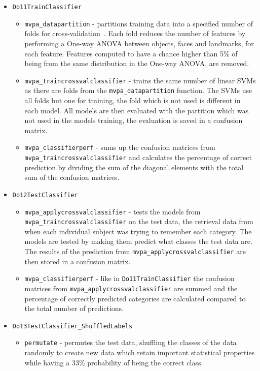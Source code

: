 \documentclass[12pt, a4paper]{article}
\begin{document}
\begin{itemize}
    \item \texttt{Do11TrainClassifier}
    \begin{itemize}
        \item \texttt{mvpa\_datapartition} - partitions training data into a specified number of folds for cross-validation~\cite{enwiki:crossvalidation}.
        Each fold reduces the number of features by performing a One-way ANOVA between objects, faces and landmarks, for each feature.
        Features computed to have a chance higher than 5\% of being from the same distribution in the One-way ANOVA, are removed.
        
        \item \texttt{mvpa\_traincrossvalclassifier} - trains the same number of linear SVMs as there are folds from the \texttt{mvpa\_datapartition} function.
        The SVMs use all folds but one for training, the fold which is not used is different in each model.
        All models are then evaluated with the partition which was not used in the models training, the evaluation is saved in a confusion matrix.
        
        \item \texttt{mvpa\_classifierperf} - sums up the confusion matrices from \texttt{mvpa\_traincrossvalclassifier} and calculates the percentage of correct prediction by dividing the sum of the diagonal elements with the total sum of the confusion matrices.
    \end{itemize}
    \item \texttt{Do12TestClassifier}
    \begin{itemize}
        
        \item \texttt{mvpa\_applycrossvalclassifier} - tests the models from \\
        \texttt{mvpa\_traincrossvalclassifier} on the test data, the retrieval data from when each individual subject was trying to remember each category.
        The models are tested by making them predict what classes the test data are.
        The results of the prediction from \texttt{mvpa\_applycrossvalclassifier} are then stored in a confusion matrix.
        
        \item \texttt{mvpa\_classifierperf} - like in \texttt{Do11TrainClassifier} the confusion matrices from \texttt{mvpa\_applycrossvalclassifier} are summed and the percentage of correctly predicted categories are calculated compared to the total number of predictions.
    \end{itemize}
    \item \texttt{Do13TestClassifier\_ShuffledLabels}
    \begin{itemize}
        \item \texttt{permutate} - permutes the test data, shuffling the classes of the data randomly to create new data which retain important statistical properties while having a 33\% probability of being the correct class.
        

\end{itemize}
\end{itemize}
\end{document}
